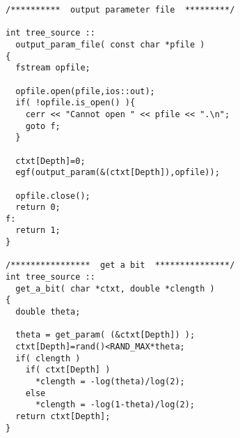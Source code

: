 \begin{verbatim}
/**********  output parameter file  *********/

int tree_source ::
  output_param_file( const char *pfile )
{
  fstream opfile;

  opfile.open(pfile,ios::out);
  if( !opfile.is_open() ){
    cerr << "Cannot open " << pfile << ".\n";
    goto f;
  }

  ctxt[Depth]=0;
  egf(output_param(&(ctxt[Depth]),opfile));

  opfile.close();
  return 0;
f:
  return 1;
}

/****************  get a bit  ***************/
int tree_source ::
  get_a_bit( char *ctxt, double *clength )
{
  double theta;

  theta = get_param( (&ctxt[Depth]) );
  ctxt[Depth]=rand()<RAND_MAX*theta;
  if( clength )
    if( ctxt[Depth] )
      *clength = -log(theta)/log(2);
    else
      *clength = -log(1-theta)/log(2);
  return ctxt[Depth];
}
\end{verbatim}
